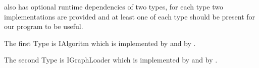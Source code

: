 \par

\basemodule[.main] also has optional runtime dependencies of two types,
for each type two implementations are provided and at least one of each type should be present for our program to be useful.

The first Type is IAlgoritm which is implemented by  and by .

The second Type is IGraphLoader which is implemented by   and by .
